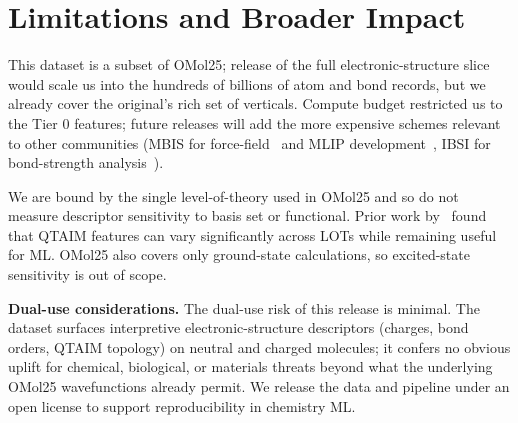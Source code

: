 \section{Limitations and Broader Impact}
\label{sec:limits}

This dataset is a subset of OMol25; release of the full electronic-structure
slice would scale us into the hundreds of billions of atom and bond records, but
we already cover the original's rich set of verticals.  Compute budget restricted
us to the Tier 0 features; future releases will add the more expensive schemes
relevant to other communities (MBIS for force-field~\citep{mbis} and MLIP
development~\citep{bamboo}, IBSI for bond-strength analysis~\citep{ibsi}).

We are bound by the single level-of-theory used in OMol25 and so do not measure
descriptor sensitivity to basis set or functional. Prior work
by~\citet{D5DD00220F} found that QTAIM features can vary significantly across
LOTs while remaining useful for ML. OMol25 also covers only ground-state
calculations, so excited-state sensitivity is out of scope.

\textbf{Dual-use considerations.} The dual-use risk of this
release is minimal. The dataset surfaces interpretive electronic-structure
descriptors (charges, bond orders, QTAIM topology) on neutral and charged
molecules; it confers no obvious uplift for chemical, biological, or materials
threats beyond what the underlying OMol25 wavefunctions already permit. We
release the data and pipeline under an open license to support reproducibility
in chemistry ML.

